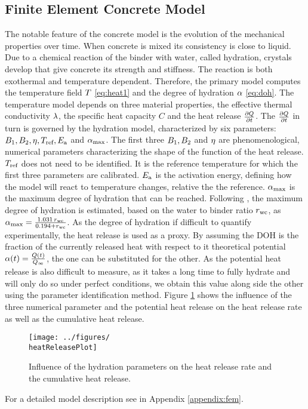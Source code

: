 \subsection{Finite Element Concrete Model}
The notable feature of the concrete model is the evolution of the mechanical properties over time.
When concrete is mixed its consistency is close to liquid.
Due to a chemical reaction of the binder with water, called hydration, crystals develop that give concrete its strength and stiffness.
The reaction is both exothermal and temperature dependent.
Therefore, the primary model computes the temperature field $T$ \eqref{eq:heat1} and the degree of hydration $\alpha$ \eqref{eq:doh}.
The temperature model depends on three material properties, the effective thermal conductivity $\lambda$, the specific heat capacity $C$ and the heat release $\frac{\partial Q}{\partial t}$.
The $\frac{\partial Q}{\partial t}$ in turn is governed by the hydration model, characterized by six parameters:
$B_1, B_2, \eta, T_{\text{ref}}, E_{\text{a}}$ and $\alpha_{\text{max}}$.
The first three $B_1, B_2$ and $\eta$ are phenomenological, numerical parameters characterizing the shape of the function of the heat release.
$T_{\text{ref}}$ does not need to be identified.
It is the reference temperature for which the first three parameters are calibrated.
$E_{\text{a}}$ is the activation energy, defining how the model will react to temperature changes, relative the the reference. 
$\alpha_{\text{max}}$ is the maximum degree of hydration that can be reached.
Following \cite{Mills1966fico}, the maximum degree of hydration is estimated, based on the water to binder ratio $r_{\text{wc}}$, as $\alpha_{\text{max}} = \frac{1.031\,r_{\text{wc}}}{0.194 + r_{\text{wc}}}$.
As the degree of hydration if difficult to quantify experimentally, the heat release is used as a proxy.
By assuming the DOH is the fraction of the currently released heat with respect to it theoretical potential $\alpha(t) = \frac{Q(t)}{Q_{\infty}}$, the one can be substituted for the other.
As the potential heat release is also difficult to measure, as it takes a long time to fully hydrate and will only do so under perfect conditions, we obtain this value along side the other using the parameter identification method.
Figure \ref{fig:heatrelease} shows the influence of the three numerical parameter and the potential heat release on the heat release rate as well as the cumulative heat release.
\begin{figure}[h]%
	\centering
	\texttt{[image: ../figures/\\heatReleasePlot]}
	\caption{Influence of the hydration parameters on the heat release rate and the cumulative heat release.}\label{fig:heatrelease}
\end{figure}
For a detailed model description see in Appendix \ref{appendix:fem}.

